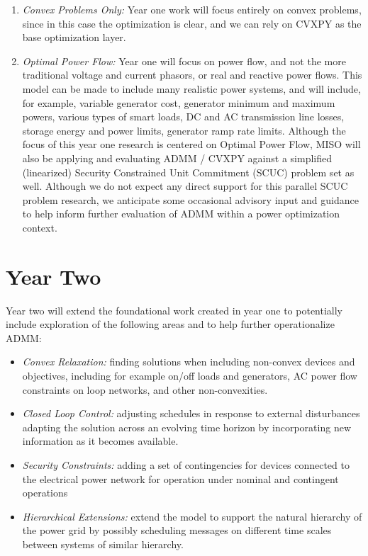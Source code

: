 \documentclass[12pt]{article}
\begin{document}
\begin{enumerate}
\item \emph{Convex Problems Only:}
Year one work will focus entirely on convex problems,
since in this case the optimization is clear,
and we can rely on CVXPY as the base optimization layer.

\item \emph{Optimal Power Flow:}
Year one will focus on power flow,
and not the more traditional voltage and current phasors,
or real and reactive power flows.
This model can be made to include many realistic power systems,
and will include, for example, variable generator cost,
generator minimum and maximum powers,
various types of smart loads, DC and AC transmission line losses,
storage energy and power limits,
generator ramp rate limits.
Although the focus of this year one research is centered on Optimal Power Flow,
MISO will also be applying and evaluating ADMM / CVXPY
against a simplified (linearized) Security Constrained
Unit Commitment (SCUC) problem set as well.
Although we do not expect any direct support for
this parallel SCUC problem research,
we anticipate some occasional advisory input and guidance
to help inform further evaluation of ADMM within a power optimization context.

\end{enumerate}

\section{Year Two}

Year two will extend the foundational work created in year one
to potentially include exploration of the 
following areas and to help further operationalize ADMM:

\begin{itemize}
\item \emph{Convex Relaxation:} 
finding solutions when including non-convex devices and objectives, 
including for example on/off loads and generators,
AC power flow constraints on loop networks, 
and other non-convexities.

\item \emph{Closed Loop Control:} 
adjusting schedules in response to external disturbances adapting the
solution across an evolving time horizon by incorporating new information as it becomes
available.

\item \emph{Security Constraints:} 
adding a set of contingencies for devices connected to the electrical
power network for operation under nominal and contingent operations
 
\item \emph{Hierarchical Extensions:}
extend the model to support the natural hierarchy of the power grid 
by possibly scheduling messages on different time scales between systems of similar hierarchy.
\end{itemize}
\end{document}
